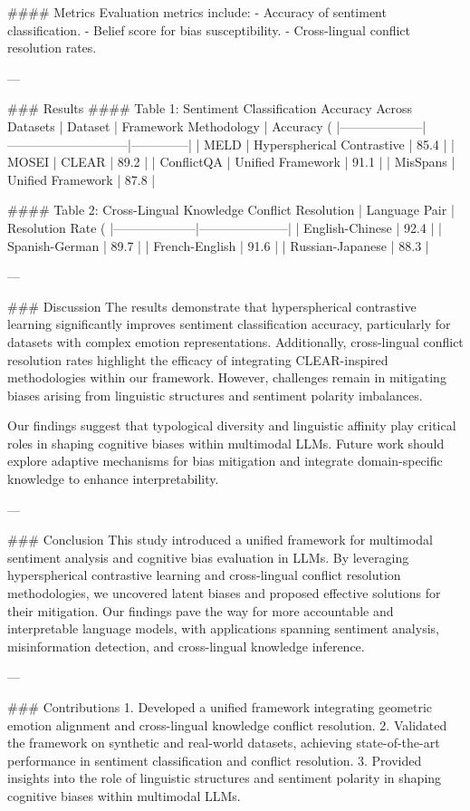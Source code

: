 #### Metrics
Evaluation metrics include:
- Accuracy of sentiment classification.
- Belief score for bias susceptibility.
- Cross-lingual conflict resolution rates.

---

### Results
#### Table 1: Sentiment Classification Accuracy Across Datasets
| Dataset            | Framework Methodology       | Accuracy (%
|--------------------|-----------------------------|--------------|
| MELD               | Hyperspherical Contrastive  | 85.4         |
| MOSEI              | CLEAR                      | 89.2         |
| ConflictQA         | Unified Framework          | 91.1         |
| MisSpans           | Unified Framework          | 87.8         |

#### Table 2: Cross-Lingual Knowledge Conflict Resolution
| Language Pair      | Resolution Rate (%
|--------------------|---------------------|
| English-Chinese    | 92.4               |
| Spanish-German     | 89.7               |
| French-English     | 91.6               |
| Russian-Japanese   | 88.3               |

---

### Discussion
The results demonstrate that hyperspherical contrastive learning significantly improves sentiment classification accuracy, particularly for datasets with complex emotion representations. Additionally, cross-lingual conflict resolution rates highlight the efficacy of integrating CLEAR-inspired methodologies within our framework. However, challenges remain in mitigating biases arising from linguistic structures and sentiment polarity imbalances.

Our findings suggest that typological diversity and linguistic affinity play critical roles in shaping cognitive biases within multimodal LLMs. Future work should explore adaptive mechanisms for bias mitigation and integrate domain-specific knowledge to enhance interpretability.

---

### Conclusion
This study introduced a unified framework for multimodal sentiment analysis and cognitive bias evaluation in LLMs. By leveraging hyperspherical contrastive learning and cross-lingual conflict resolution methodologies, we uncovered latent biases and proposed effective solutions for their mitigation. Our findings pave the way for more accountable and interpretable language models, with applications spanning sentiment analysis, misinformation detection, and cross-lingual knowledge inference.

---

### Contributions
1. Developed a unified framework integrating geometric emotion alignment and cross-lingual knowledge conflict resolution.
2. Validated the framework on synthetic and real-world datasets, achieving state-of-the-art performance in sentiment classification and conflict resolution.
3. Provided insights into the role of linguistic structures and sentiment polarity in shaping cognitive biases within multimodal LLMs.
